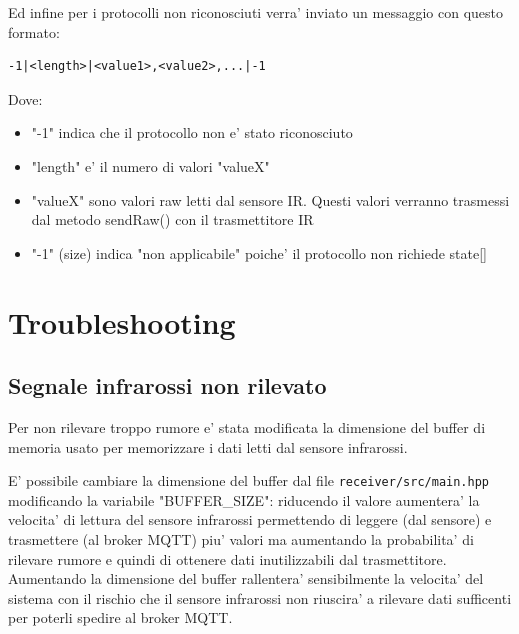 \documentclass[a4paper,11pt]{article}
\begin{document}
    Ed infine per i protocolli non riconosciuti verra' inviato un messaggio con questo formato:

    \begin{verbatim}
-1|<length>|<value1>,<value2>,...|-1
    \end{verbatim}

    Dove:
    \begin{itemize}
        \item "-1" indica che il protocollo non e' stato riconosciuto
        \item "length" e' il numero di valori "valueX"
        \item "valueX" sono valori raw letti dal sensore IR. Questi valori verranno trasmessi dal metodo sendRaw() con il trasmettitore IR
        \item "-1" (size) indica "non applicabile" poiche' il protocollo non richiede state[]
    \end{itemize}

\section{Troubleshooting}

    \subsection{Segnale infrarossi non rilevato}

    Per non rilevare troppo rumore e' stata modificata la dimensione del buffer di memoria usato per memorizzare i dati letti dal sensore infrarossi.

    E' possibile cambiare la dimensione del buffer dal file \texttt{receiver/src/main.hpp} modificando la variabile "BUFFER\_SIZE": riducendo il valore aumentera' la velocita' di lettura 
    del sensore infrarossi permettendo di leggere (dal sensore) e trasmettere (al broker MQTT) piu' valori ma aumentando la probabilita' di rilevare rumore e quindi di ottenere dati inutilizzabili dal trasmettitore.
    Aumentando la dimensione del buffer rallentera' sensibilmente la velocita' del sistema con il rischio che il sensore infrarossi non riuscira' a rilevare dati sufficenti per poterli spedire al broker MQTT.

\clearpage

\listoffigures
{}
\end{document}

